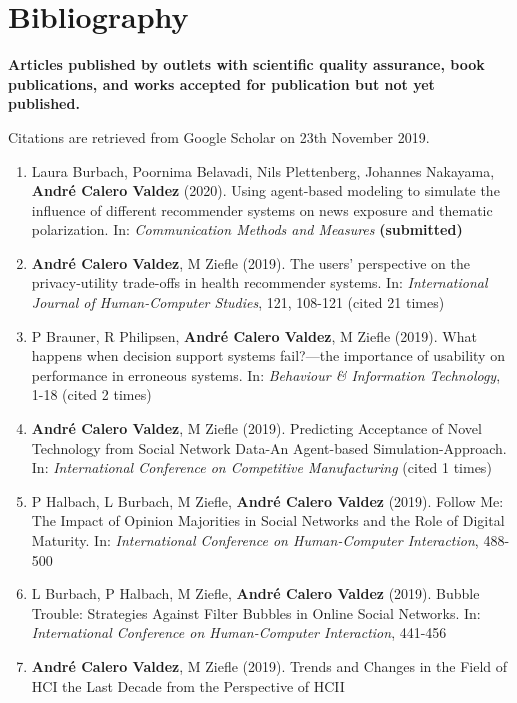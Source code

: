 \documentclass[11pt,a4paper,sans]{moderncv}
\providecommand{\tightlist}{%
	\setlength{\itemsep}{0pt}\setlength{\parskip}{0pt}}
\begin{document}
\hypertarget{bibliography}{%
\section{Bibliography}\label{bibliography}}

\textbf{Articles published by outlets with scientific quality assurance,
book publications, and works accepted for publication but not yet
published.}

Citations are retrieved from Google Scholar on 23th November 2019.

\begin{enumerate}
\def\labelenumi{\arabic{enumi}.}
\tightlist
\item
  Laura Burbach, Poornima Belavadi, Nils Plettenberg, Johannes Nakayama,
  \textbf{André Calero Valdez} (2020). Using agent-based modeling to
  simulate the influence of different recommender systems on news
  exposure and thematic polarization. In: \emph{Communication Methods
  and Measures} \textbf{(submitted)}
\item
  \textbf{André Calero Valdez}, M Ziefle (2019). The users' perspective
  on the privacy-utility trade-offs in health recommender systems. In:
  \emph{International Journal of Human-Computer Studies}, 121, 108-121
  (cited 21 times)
\item
  P Brauner, R Philipsen, \textbf{André Calero Valdez}, M Ziefle (2019).
  What happens when decision support systems fail?---the importance of
  usability on performance in erroneous systems. In: \emph{Behaviour \&
  Information Technology}, 1-18 (cited 2 times)
\item
  \textbf{André Calero Valdez}, M Ziefle (2019). Predicting Acceptance
  of Novel Technology from Social Network Data-An Agent-based
  Simulation-Approach. In: \emph{International Conference on Competitive
  Manufacturing} (cited 1 times)
\item
  P Halbach, L Burbach, M Ziefle, \textbf{André Calero Valdez} (2019).
  Follow Me: The Impact of Opinion Majorities in Social Networks and the
  Role of Digital Maturity. In: \emph{International Conference on
  Human-Computer Interaction}, 488-500
\item
  L Burbach, P Halbach, M Ziefle, \textbf{André Calero Valdez} (2019).
  Bubble Trouble: Strategies Against Filter Bubbles in Online Social
  Networks. In: \emph{International Conference on Human-Computer
  Interaction}, 441-456
\item
  \textbf{André Calero Valdez}, M Ziefle (2019). Trends and Changes in
  the Field of HCI the Last Decade from the Perspective of HCII

\end{enumerate}
\end{document}

